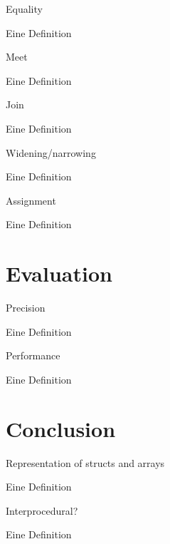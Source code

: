 \documentclass{beamer}
\begin{document}
\begin{frame}{Equality}
    \begin{Definition}
        Eine Definition
    \end{Definition}
\end{frame}

\begin{frame}{Meet}
    \begin{Definition}
        Eine Definition
    \end{Definition}
\end{frame}

\begin{frame}{Join}
    \begin{Definition}
        Eine Definition
    \end{Definition}
\end{frame}

\begin{frame}{Widening/narrowing}
    \begin{Definition}
        Eine Definition
    \end{Definition}
\end{frame}

\begin{frame}{Assignment}
    \begin{Definition}
        Eine Definition
    \end{Definition}
\end{frame}



\section{Evaluation}
\frame{\tableofcontents[currentsection]}

\begin{frame}{Precision}
    \begin{Definition}
        Eine Definition
    \end{Definition}
\end{frame}

\begin{frame}{Performance}
    \begin{Definition}
        Eine Definition
    \end{Definition}
\end{frame}


\section{Conclusion}
\frame{\tableofcontents[currentsection]}

\appendix

\begin{frame}{Representation of structs and arrays}
    \begin{Definition}
        Eine Definition
    \end{Definition}
\end{frame}



\begin{frame}{Interprocedural?}
    \begin{Definition}
        Eine Definition
    \end{Definition}
\end{frame}
\end{document}

